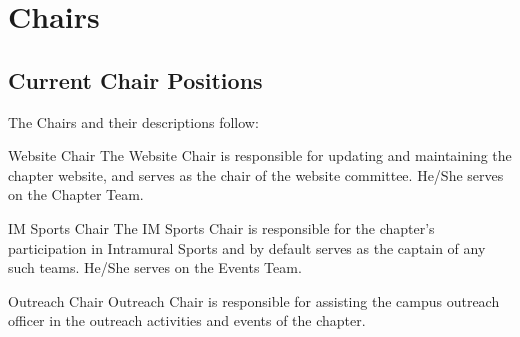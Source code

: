 \chapter{Chairs}\label{sec:Chairs} 
\section{Current Chair Positions} The Chairs and their descriptions follow:\\
\begin{enumsubsection}
\item{Website Chair} The Website Chair is responsible for updating and maintaining the chapter website, and serves as the chair of the website committee. He/She serves on the Chapter Team.
\item{IM Sports Chair} The IM Sports Chair is responsible for the chapter's participation in Intramural Sports and by default serves as the captain of any such teams. He/She serves on the Events Team.
\item{Outreach Chair} Outreach Chair is responsible for assisting the
campus outreach officer in the outreach activities and events of the chapter.
\end{enumsubsection}